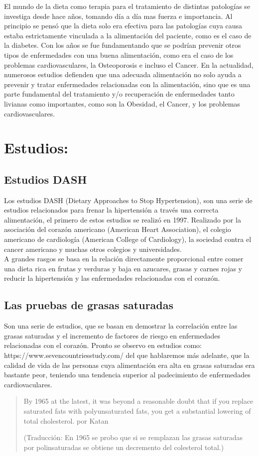 
El mundo de la dieta como terapia para el tratamiento de distintas patologías se investiga desde hace años, tomando día a día mas fuerza e importancia. Al principio se pensó que la dieta solo era efectiva para las patologías cuya causa estaba estrictamente vinculada a la alimentación del paciente, como es el caso de la diabetes. Con los años se fue fundamentando que se podrían prevenir otros tipos de enfermedades con una buena alimentación, como era el caso de los problemas cardiovasculares, la Osteoporosis e incluso el Cancer. En la actualidad, numerosos estudios defienden que una adecuada alimentación no solo ayuda a prevenir y tratar enfermedades relacionadas con la alimentación, sino que es una parte fundamental del tratamiento y/o recuperación de enfermedades tanto livianas como importantes, como son la Obesidad, el Cancer, y los problemas cardiovasculares.
\section{Estudios:} 
\label{estudios}
\subsection{Estudios DASH \cite{dashStudies}} 
Los estudios DASH (Dietary Approaches to Stop Hypertension), son una serie de estudios relacionados para frenar la hipertensión a través una correcta alimentación, el primero de estos estudios se realizó en 1997. Realizado por la asociación del corazón americano (American Heart Association), el colegio americano de cardiología (American College of Cardiology), la sociedad contra el cancer americano y muchas otros colegios y universidades.\\

A grandes rasgos se basa en la relación directamente proporcional entre comer una dieta rica en frutas y verduras y baja en azucares, grasas y carnes rojas y reducir  la hipertensión y las enfermedades relacionadas con el corazón.\\
\subsection{Las pruebas de grasas saturadas}
Son una serie de estudios, que se basan en demostrar la correlación entre las grasas saturadas y el incremento de factores de riesgo en enfermedades relacionadas con el corazón.
Pronto se observo en estudios como: https://www.sevencountriesstudy.com/ del que hablaremos más adelante, que la calidad de vida de las personas cuya alimentación era alta en grasas saturadas era bastante peor, teniendo una tendencia superior al padecimiento de enfermedades cardiovaculares.\\
\begin{quote}
By 1965 at the latest, it was beyond a reasonable doubt that if you replace saturated fats with polyunsaturated fats, you get a substantial lowering of total cholesterol. por Katan

(Traducción: En 1965 se probo que si se remplazan las grasas saturadas por polinsaturadas se obtiene un decremento del colesterol total.)
\end{quote}

